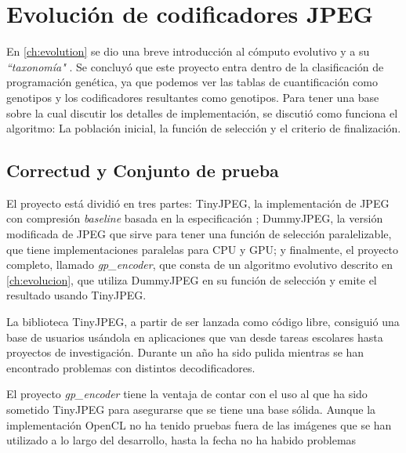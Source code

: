 
\chapter{Evolución de codificadores JPEG}\label{ch:resultados_evolucion}

En \ref{ch:evolution} se dio una breve introducción al cómputo evolutivo y a su
\emph{ ``taxonomía" }. Se concluyó que este proyecto entra dentro de la
clasificación de programación genética, ya que podemos ver las tablas de
cuantificación como genotipos y los codificadores resultantes como genotipos.
Para tener una base sobre la cual discutir los detalles de implementación, se
discutió como funciona el algoritmo: La población inicial, la función de
selección y el criterio de finalización.

\section{Correctud y Conjunto de prueba} \label{sec:testset}

El proyecto está dividió en tres partes: TinyJPEG, la implementación de JPEG
con compresión \emph{baseline} basada en la especificación \cite{jpeg-spec};
DummyJPEG, la versión modificada de JPEG que sirve para tener una función de
selección paralelizable, que tiene implementaciones paralelas para CPU y GPU; y
finalmente, el proyecto completo, llamado \emph{gp\_encoder}, que consta de un
algoritmo evolutivo descrito en \ref{ch:evolucion}, que utiliza DummyJPEG en su
función de selección y emite el resultado usando TinyJPEG.

La biblioteca TinyJPEG, a partir de ser lanzada como código libre, consiguió
una base de usuarios usándola en aplicaciones que van desde tareas escolares
hasta proyectos de investigación. Durante un año ha sido pulida mientras se han
encontrado problemas con distintos decodificadores.

El proyecto \emph{gp\_encoder} tiene la ventaja de contar con el uso al que ha
sido sometido TinyJPEG para asegurarse que se tiene una base sólida. Aunque la
implementación OpenCL no ha tenido pruebas fuera de las imágenes que se han
utilizado a lo largo del desarrollo, hasta la fecha no ha habido problemas


